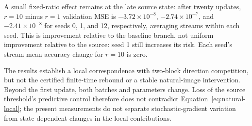 A small fixed-ratio effect remains at the late source state: after twenty updates, $r=10$ minus $r=1$ validation MSE is $-3.72\times10^{-8}$, $-2.74\times10^{-7}$, and $-2.41\times10^{-8}$ for seeds 0, 1, and 12, respectively, averaging streams within each seed. This is improvement relative to the baseline branch, not uniform improvement relative to the source: seed 1 still increases its risk. Each seed's stream-mean accuracy change for $r=10$ is zero.

The results establish a local correspondence with two-block direction competition, but not the certified finite-time rebound or a stable natural-image intervention. Beyond the first update, both batches and parameters change. Loss of the source threshold's predictive control therefore does not contradict Equation~\eqref{eq:natural-local}; the present measurements do not separate stochastic-gradient variation from state-dependent changes in the local contributions.
